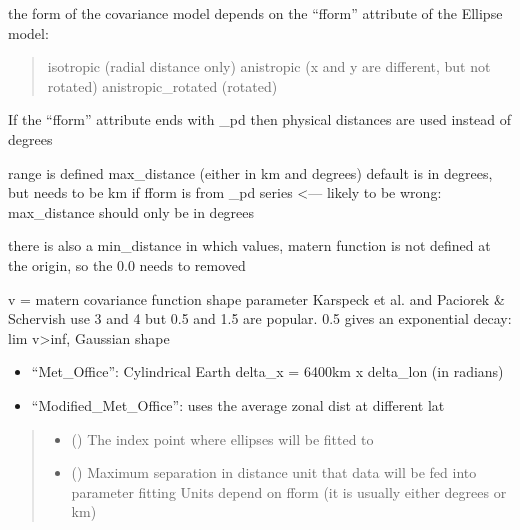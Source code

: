 \documentclass[letterpaper,10pt,english]{sphinxmanual}
\begin{document}
\begin{fulllineitems}
\begin{fulllineitems}
\sphinxAtStartPar
the form of the covariance model depends on the “fform” attribute of the
Ellipse model:
\begin{quote}

\sphinxAtStartPar
isotropic (radial distance only)
anistropic (x and y are different, but not rotated)
anistropic\_rotated (rotated)
\end{quote}

\sphinxAtStartPar
If the “fform” attribute ends with \_pd then physical distances are used
instead of degrees

\sphinxAtStartPar
range is defined max\_distance (either in km and degrees)
default is in degrees, but needs to be km if fform is from \_pd series
\textless{}— likely to be wrong: max\_distance should only be in degrees

\sphinxAtStartPar
there is also a min\_distance in which values,
matern function is not defined at the origin, so the 0.0 needs to
removed

\sphinxAtStartPar
v = matern covariance function shape parameter
Karspeck et al.  and Paciorek \& Schervish
use 3 and 4 but 0.5 and 1.5 are popular. 0.5 gives an exponential decay:
lim v\textendash{}\textgreater{}inf, Gaussian shape
\begin{description}
\begin{itemize}
\item {}
\sphinxAtStartPar
“Met\_Office”: Cylindrical Earth delta\_x = 6400km x delta\_lon
(in radians)

\item {}
\sphinxAtStartPar
“Modified\_Met\_Office”: uses the average zonal dist at different
lat

\end{itemize}

\end{description}
\begin{quote}\begin{description}
\begin{itemize}
\item {}
\sphinxAtStartPar
{} () \textendash{} The index point where ellipses will be fitted to

\item {}
\sphinxAtStartPar
{} () \textendash{} Maximum separation in distance unit that data will be fed
into parameter fitting
Units depend on fform (it is usually either degrees or km)


\end{itemize}
\end{description}
\end{quote}
\end{fulllineitems}
\end{fulllineitems}
\end{document}

